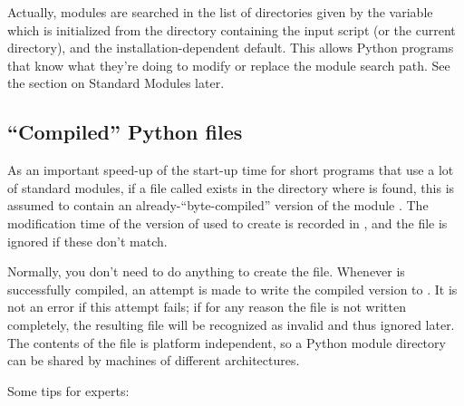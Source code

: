 \documentclass{manual}
\begin{document}
Actually, modules are searched in the list of directories given by the 
variable  which is initialized from the directory 
containing the input script (or the current directory),
 and the installation-dependent default.  This allows
Python programs that know what they're doing to modify or replace the 
module search path.  See the section on Standard Modules later.

\subsection{``Compiled'' Python files}

As an important speed-up of the start-up time for short programs that
use a lot of standard modules, if a file called  exists
in the directory where  is found, this is assumed to
contain an already-``byte-compiled'' version of the module .
The modification time of the version of  used to create
 is recorded in , and the file is
ignored if these don't match.

Normally, you don't need to do anything to create the  file.
Whenever  is successfully compiled, an attempt is made to
write the compiled version to .  It is not an error if
this attempt fails; if for any reason the file is not written
completely, the resulting  file will be recognized as
invalid and thus ignored later.  The contents of the 
file is platform independent, so a Python module directory can be
shared by machines of different architectures.

Some tips for experts:
\end{document}
